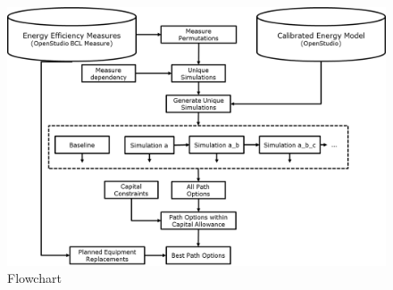 \documentclass[review]{elsarticle}
\begin{document}
\begin{figure}[h]
	\centering\includegraphics[width=0.8\linewidth]{flowchart.png}
	\caption{Flowchart}
	\label{flowchart}
\end{figure}
\end{document}
